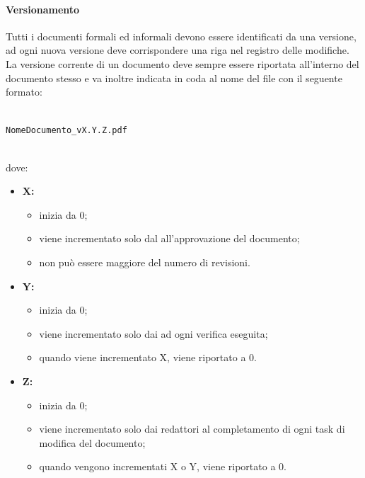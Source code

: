             \paragraph{Versionamento}\label{sec:versionamento}
            Tutti i documenti formali ed informali devono essere identificati da una versione, ad ogni nuova versione deve corrispondere una riga nel registro delle modifiche.
            La versione corrente di un documento deve sempre essere riportata all'interno del documento stesso e va inoltre indicata in coda al nome del file con il seguente formato:\\\\
            \centerline{\texttt{NomeDocumento\_vX.Y.Z.pdf}}\\
            dove:
            \begin{itemize}
                \item \textbf{X:}
                \begin{itemize}
                    \item inizia da 0;
                    \item viene incrementato solo dal \responsabilediprogetto{} all'approvazione del documento;
                    \item non può essere maggiore del numero di revisioni.
                \end{itemize}
                \item \textbf{Y:}
                \begin{itemize}
                    \item inizia da 0;
                    \item viene incrementato solo dai \verificatori{} ad ogni verifica eseguita;
                    \item quando viene incrementato X, viene riportato a 0.
                \end{itemize}
                \item \textbf{Z:}
                \begin{itemize}
                    \item inizia da 0;
                    \item viene incrementato solo dai redattori al completamento di ogni task di modifica del documento;
                    \item quando vengono incrementati X o Y, viene riportato a 0.
                \end{itemize}
            \end{itemize}

